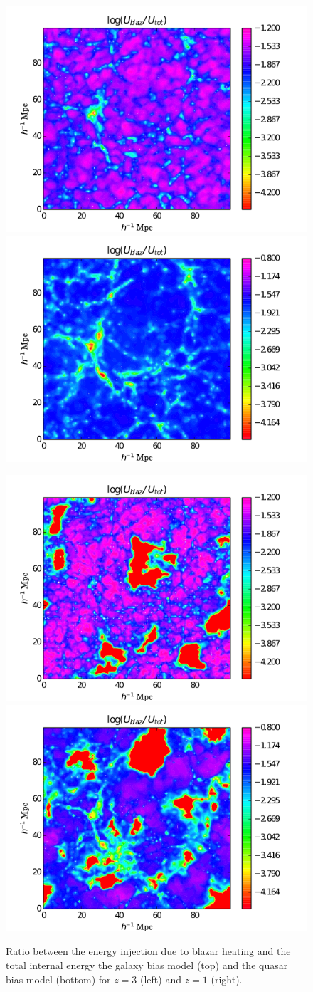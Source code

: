 \documentclass[twocolumns]{emulateapj}
\begin{document}
\begin{figure}
  \centering

  \includegraphics[width = .45\textwidth ]{data_U_z3_gal2.png}
  \includegraphics[width = .45\textwidth ]{data_U_z1_gal2.png}

  \includegraphics[width = .45\textwidth ]{data_U_z3_qso4.png}
  \includegraphics[width = .45\textwidth ]{data_U_z1_qso4.png}
   \caption{Ratio between the energy injection due to blazar heating and the total internal energy the galaxy bias model (top) and the quasar bias model (bottom) for $z=3$ (left) and $z=1$ (right).}
  \label{fig:heating_ratio}
\end{figure}
\end{document}

